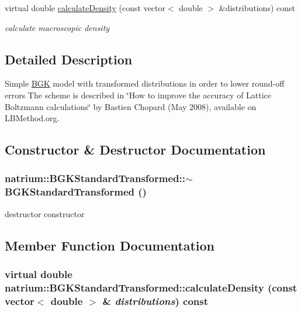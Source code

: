 \begin{DoxyCompactItemize}
\item 
virtual double \hyperlink{classnatrium_1_1BGKStandardTransformed_a58c4dc0c67ff4898c6555b614afc1ace}{calculateDensity} (const vector$<$ double $>$ \&distributions) const 
\begin{DoxyCompactList}\small\item\em calculate macroscopic density \item\end{DoxyCompactList}\end{DoxyCompactItemize}


\subsection{Detailed Description}
Simple \hyperlink{classnatrium_1_1BGK}{BGK} model with transformed distributions in order to lower round-\/off errors The scheme is described in \char`\"{}How to improve the accuracy of Lattice Boltzmann calculations\char`\"{} by Bastien Chopard (May 2008), available on LBMethod.org. 

\subsection{Constructor \& Destructor Documentation}
\hypertarget{classnatrium_1_1BGKStandardTransformed_a07dc7f5ccaf1abaa725a7b62a2b79ac4}{
\subsubsection[{$\sim$BGKStandardTransformed}]{\setlength{\rightskip}{0pt plus 5cm}natrium::BGKStandardTransformed::$\sim$BGKStandardTransformed ()}}
\label{classnatrium_1_1BGKStandardTransformed_a07dc7f5ccaf1abaa725a7b62a2b79ac4}


destructor constructor 

\subsection{Member Function Documentation}
\hypertarget{classnatrium_1_1BGKStandardTransformed_a58c4dc0c67ff4898c6555b614afc1ace}{
\subsubsection[{calculateDensity}]{\setlength{\rightskip}{0pt plus 5cm}virtual double natrium::BGKStandardTransformed::calculateDensity (const vector$<$ double $>$ \& {\em distributions}) const}}
\label{classnatrium_1_1BGKStandardTransformed_a58c4dc0c67ff4898c6555b614afc1ace}


